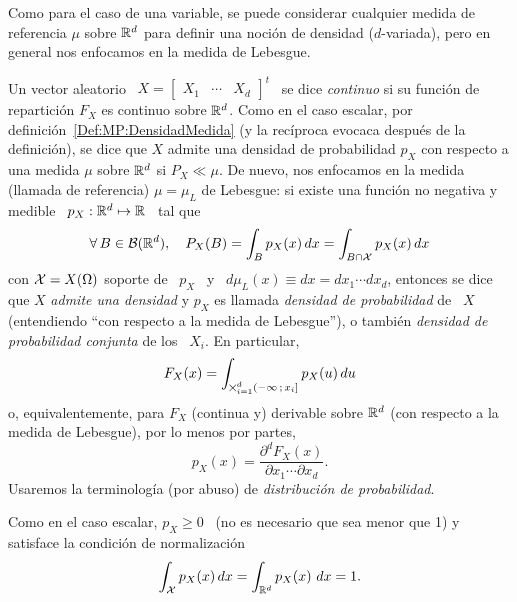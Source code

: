 
\label{Ssec:MP:VecContinuo}

Como  para el  caso de  una variable,  se puede  considerar cualquier  medida de
referencia  $\mu$  sobre  $\mathbb{R}^d$   para  definir  una  noci\'on  de  densidad
($d$-variada), pero en general nos enfocamos en la medida de Lebesgue.

\begin{definicion}
\label{Def:MP:VectorAleatorioContinuo}
%
  Un vector aleatorio \ $X = \begin{bmatrix} X_1 & \cdots & X_d \end{bmatrix}^t$
  \ se  dice {\it continuo} si  su funci\'on de repartici\'on  $F_X$ es continuo
  sobre      $\mathbb{R}^d$.      Como      en     el      caso      escalar,     por
  definici\'on~\ref{Def:MP:DensidadMedida}  (y la rec\'iproca  evocaca despu\'es
  de la definici\'on), se dice que $X$ admite una densidad de probabilidad $p_X$
  con respecto a  una medida $\mu$ sobre $\mathbb{R}^d$ si $P_X  \ll \mu$.  De nuevo,
  nos enfocamos en la medida (llamada  de referencia) $\mu = \mu_L$ de Lebesgue:
  si existe una funci\'on no negativa y medible \ $p_X: \mathbb{R}^d \mapsto \mathbb{R}$ \
  tal que
  \[
  \forall \,  B \in \mathcal{B}(\mathbb{R}^d),  \quad P_X(B) =  \int_B p_X(x) \, dx  = \int_{B
    \cap \mathcal{X}} p_X(x) \, dx
  \]
  con $\mathcal{X}  = X(\Omega)$ soporte  de \ $p_X$  \ y \  $d\mu_L(x) \equiv dx  = dx_1
  \cdots dx_d$,  entonces se dice que $X$  {\it admite una densidad}  y $p_X$ es
  llamada {\it densidad de probabilidad}  de \ $X$ (entendiendo ``con respecto a
  la medida de Lebesgue''), o  tambi\'en {\it densidad de probabilidad conjunta}
  de los \ $X_i$. En particular,
  \[
  F_X(x) =  \int_{\operatorname*{\bigtimes}_{i=1}^d (-\infty \, ; \, x_i]} p_X(u) \, du
  \]
  o, equivalentemente,  para $F_X$ (continua  y) derivable sobre  $\mathbb{R}^d$ (con
  respecto a la medida de Lebesgue), por lo menos por partes,
  \[
  p_X(x) = \frac{\partial^d F_X(x)}{\partial x_1 \cdots \partial x_d}.
  \]
  Usaremos   la   terminolog\'ia  (por   abuso)   de   {\it  distribuci\'on   de
    probabilidad}.
\end{definicion}

Como en el caso  escalar, $p_X \ge 0$ \ (no es necesario que  sea menor que 1) y
satisface la condici\'on de normalizaci\'on
%
\[
\int_{\mathcal{X}} p_X(x) \, dx = \int_{\mathbb{R}^d} p_X(x) \ dx  = 1.
\]

